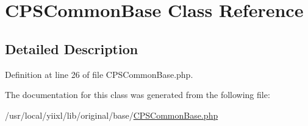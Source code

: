 \hypertarget{classCPSCommonBase}{
\section{CPSCommonBase Class Reference}
\label{classCPSCommonBase}
}


\subsection{Detailed Description}


Definition at line 26 of file CPSCommonBase.php.



The documentation for this class was generated from the following file:\begin{DoxyCompactItemize}
\item 
/usr/local/yiixl/lib/original/base/\hyperlink{CPSCommonBase_8php}{CPSCommonBase.php}\end{DoxyCompactItemize}
